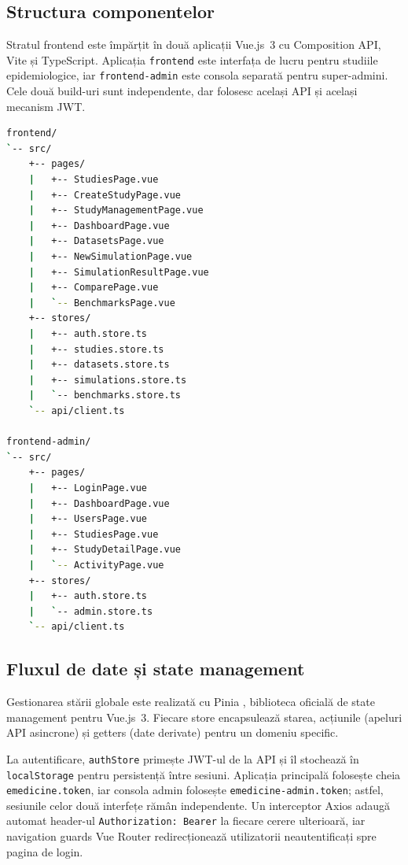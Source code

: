 \subsection{Structura componentelor}
\label{subsec:structura_vue}

Stratul frontend este împărțit în două aplicații Vue.js~3 cu Composition API,
Vite și TypeScript. Aplicația \texttt{frontend} este interfața de lucru pentru
studiile epidemiologice, iar \texttt{frontend-admin} este consola separată
pentru super-admini. Cele două build-uri sunt independente, dar folosesc același
API și același mecanism JWT.

\begin{lstlisting}[language=bash, caption={Structura simplificată a celor două aplicații Vue.js.}]
frontend/
`-- src/
    +-- pages/
    |   +-- StudiesPage.vue
    |   +-- CreateStudyPage.vue
    |   +-- StudyManagementPage.vue
    |   +-- DashboardPage.vue
    |   +-- DatasetsPage.vue
    |   +-- NewSimulationPage.vue
    |   +-- SimulationResultPage.vue
    |   +-- ComparePage.vue
    |   `-- BenchmarksPage.vue
    +-- stores/
    |   +-- auth.store.ts
    |   +-- studies.store.ts
    |   +-- datasets.store.ts
    |   +-- simulations.store.ts
    |   `-- benchmarks.store.ts
    `-- api/client.ts

frontend-admin/
`-- src/
    +-- pages/
    |   +-- LoginPage.vue
    |   +-- DashboardPage.vue
    |   +-- UsersPage.vue
    |   +-- StudiesPage.vue
    |   +-- StudyDetailPage.vue
    |   `-- ActivityPage.vue
    +-- stores/
    |   +-- auth.store.ts
    |   `-- admin.store.ts
    `-- api/client.ts
\end{lstlisting}

\subsection{Fluxul de date și state management}
\label{subsec:state_management}

Gestionarea stării globale este realizată cu Pinia \cite{pinia_docs},
biblioteca oficială de state management pentru Vue.js~3. Fiecare store
encapsulează starea, acțiunile (apeluri API asincrone) și getters (date
derivate) pentru un domeniu specific.

La autentificare, \texttt{authStore} primește JWT-ul de la API și îl stochează
în \texttt{localStorage} pentru persistență între sesiuni. Aplicația principală
folosește cheia \texttt{emedicine.token}, iar consola admin folosește
\texttt{emedicine-admin.token}; astfel, sesiunile celor două interfețe rămân
independente. Un interceptor Axios adaugă automat header-ul
\texttt{Authorization: Bearer} la fiecare cerere ulterioară, iar navigation
guards Vue Router redirecționează utilizatorii neautentificați spre pagina de
login.

